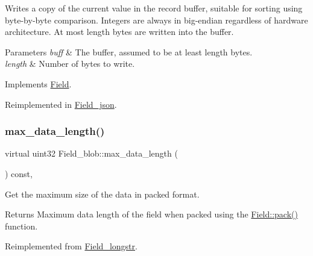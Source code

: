 Writes a copy of the current value in the record buffer, suitable for sorting using byte-\/by-\/byte comparison. Integers are always in big-\/endian regardless of hardware architecture. At most length bytes are written into the buffer.


\begin{DoxyParams}{Parameters}
{\em buff} & The buffer, assumed to be at least length bytes.\\
\hline
{\em length} & Number of bytes to write. \\
\hline
\end{DoxyParams}


Implements \mbox{\hyperlink{classField_af3bc27d237b6ae6ef3dc7a2aec3d79ac}{Field}}.



Reimplemented in \mbox{\hyperlink{classField__json_a601df7458aaa98d5c1f80d5bc2d35f3d}{Field\+\_\+json}}.

\mbox{\label{classField__blob_ae15f550d9b0f82acf200c45dc34caf07}} 
\subsubsection{\texorpdfstring{max\+\_\+data\+\_\+length()}{max\_data\_length()}}
{\footnotesize\ttfamily virtual uint32 Field\+\_\+blob\+::max\+\_\+data\+\_\+length (\begin{DoxyParamCaption}{ }\end{DoxyParamCaption}) const\hspace{0.3cm}{\ttfamily [inline]}, {\ttfamily [virtual]}}

Get the maximum size of the data in packed format.

\begin{DoxyReturn}{Returns}
Maximum data length of the field when packed using the \mbox{\hyperlink{classField_a9eaff8d3425ef0e1da69b32cbd8f2879}{Field\+::pack()}} function. 
\end{DoxyReturn}


Reimplemented from \mbox{\hyperlink{classField__longstr_a5af463c25b00c34e0d14e3780771fee0}{Field\+\_\+longstr}}.

\mbox{\label{classField__blob_a6f8231d7a8e2b8f319cf9bfc1a284252}} 
